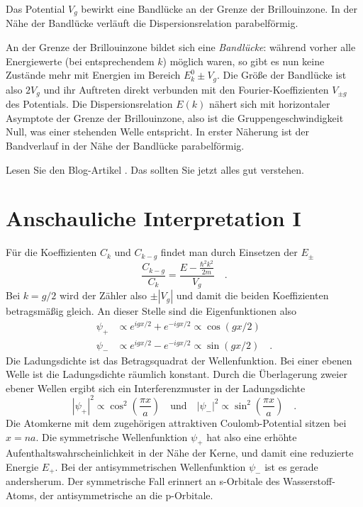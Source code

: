 \begin{marginfigure}
    \caption{Das Potential $V_g$ bewirkt eine Bandlücke an der Grenze der Brillouinzone. In der Nähe der Bandlücke verläuft die Dispersionsrelation parabelförmig.}
\end{marginfigure}

An der Grenze der Brillouinzone bildet sich eine \emph{Bandlücke}: während vorher alle Energiewerte (bei entsprechendem $k$) möglich waren, so gibt es nun keine Zustände mehr mit Energien  im Bereich $E_k^0   \pm  V_g$. Die Größe der Bandlücke ist also $2 V_g$ und ihr Auftreten direkt verbunden mit den Fourier-Koeffizienten $V_{\pm g}$ des Potentials.
Die Dispersionsrelation $E(k)$ nähert sich mit horizontaler Asymptote der Grenze der Brillouinzone, also ist die Gruppengeschwindigkeit Null, was einer stehenden Welle entspricht. In erster Näherung ist der Bandverlauf in der Nähe der Bandlücke parabelförmig. 

\begin{questions}
    \item Lesen Sie den Blog-Artikel \cite{Polakovic_cmpm3}. Das sollten Sie jetzt alles gut verstehen.
\end{questions}


\section*{Anschauliche Interpretation I}


Für die  Koeffizienten  $C_{k}$ und $C_{k - g}$ findet man durch Einsetzen der $E_\pm$
\begin{equation}
    \frac{ C_{k-g} }{ C_{k}} = \frac{E - \frac{\hbar^2 k^2}{2m}  }{V_g} \quad .
\end{equation}
Bei $k = g/2$ wird der Zähler also $\pm |V_g|$ und damit die beiden Koeffizienten betragsmäßig gleich.
An dieser Stelle sind die Eigenfunktionen  also
\begin{eqnarray}
    \psi_+ & \propto e^{i g x /2} +  e^{-i g x /2} \propto \cos (gx /2) \\
    \psi_- &\propto e^{i g x /2} -  e^{-i g x /2} \propto \sin (gx /2) \quad .
\end{eqnarray}
Die Ladungsdichte ist das Betragsquadrat der Wellenfunktion. Bei einer ebenen Welle ist die Ladungsdichte räumlich konstant. Durch die Überlagerung zweier ebener Wellen ergibt sich ein Interferenzmuster in der Ladungsdichte
\begin{equation}
    |\psi_+|^2 \propto \cos^2 \left( \frac{\pi x}{a}  \right) \quad \text{und} \quad  |\psi_-|^2 \propto \sin^2 \left( \frac{\pi x}{a}  \right)  \quad .
\end{equation}
Die Atomkerne mit dem zugehörigen attraktiven Coulomb-Potential sitzen bei $x = n a$. Die symmetrische Wellenfunktion $\psi_+$ hat also eine erhöhte Aufenthaltswahrscheinlichkeit in der Nähe der Kerne, und damit eine reduzierte Energie $E_+$. Bei der antisymmetrischen Wellenfunktion $\psi_-$ ist es gerade andersherum. Der symmetrische Fall erinnert an s-Orbitale des Wasserstoff-Atoms, der antisymmetrische an die p-Orbitale.

